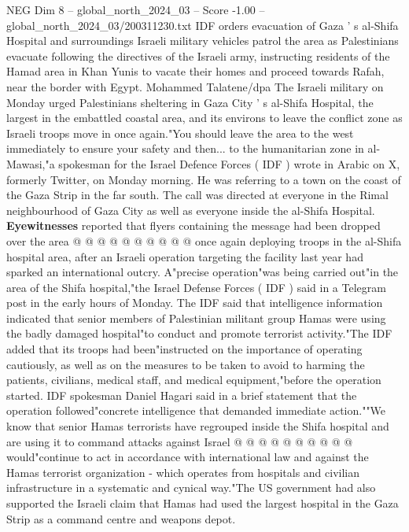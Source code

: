 \begin{textsample}{NEG Dim 8 – global\_north\_2024\_03 – Score -1.00 – global\_north\_2024\_03/200311230.txt}  \label{ex:f8_neg_445}
IDF orders evacuation of Gaza ' s al-Shifa Hospital and surroundings Israeli military vehicles patrol the area as Palestinians evacuate following the directives of the Israeli army, instructing residents of the Hamad area in Khan Yunis to vacate their homes and proceed towards Rafah, near the border with Egypt.
Mohammed Talatene/dpa The Israeli military on Monday urged Palestinians sheltering in Gaza City ' s al-Shifa Hospital, the largest in the embattled coastal area, and its environs to leave the conflict zone as Israeli troops move in once again."You should leave the area to the west immediately to ensure your safety and then... to the humanitarian zone in al-Mawasi,"a spokesman for the Israel Defence Forces ( IDF ) wrote in Arabic on X, formerly Twitter, on Monday morning.
He was referring to a town on the coast of the Gaza Strip in the far south.
The call was directed at everyone in the Rimal neighbourhood of Gaza City as well as everyone inside the al-Shifa Hospital. \textbf{Eyewitnesses} reported that flyers containing the message had been dropped over the area @ @ @ @ @ @ @ @ @ @ once again deploying troops in the al-Shifa hospital area, after an Israeli operation targeting the facility last year had sparked an international outcry.
A"precise operation"was being carried out"in the area of the Shifa hospital,"the Israel Defense Forces ( IDF ) said in a Telegram post in the early hours of Monday.
The IDF said that intelligence information indicated that senior members of Palestinian militant group Hamas were using the badly damaged hospital"to conduct and promote terrorist activity."The IDF added that its troops had been"instructed on the importance of operating cautiously, as well as on the measures to be taken to avoid to harming the patients, civilians, medical staff, and medical equipment,"before the operation started.
IDF spokesman Daniel Hagari said in a brief statement that the operation followed"concrete intelligence that demanded immediate action.""We know that senior Hamas terrorists have regrouped inside the Shifa hospital and are using it to command attacks against Israel @ @ @ @ @ @ @ @ @ @ would"continue to act in accordance with international law and against the Hamas terrorist organization - which operates from hospitals and civilian infrastructure in a systematic and cynical way."The US government had also supported the Israeli claim that Hamas had used the largest hospital in the Gaza Strip as a command centre and weapons depot.

\end{textsample}
